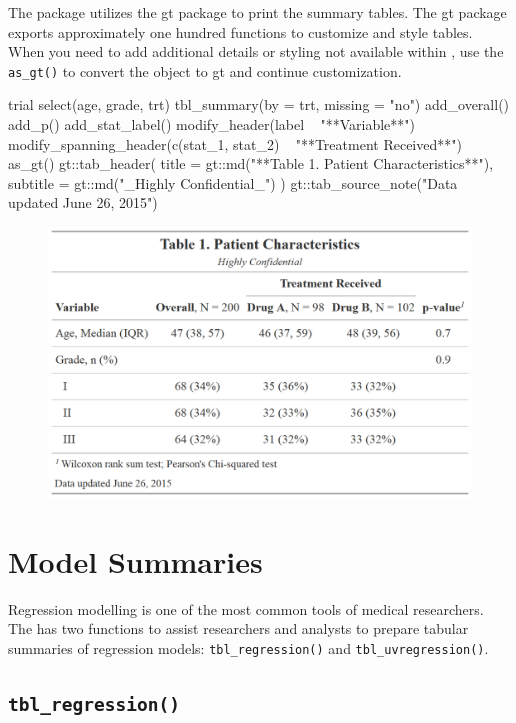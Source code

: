 The  package utilizes the gt package \citep{gt} to print the summary tables.
The gt package exports approximately one hundred functions to customize and style tables.
When you need to add additional details or styling not available within , use the \texttt{as\_gt()} to convert the  object to gt and continue customization.

\begin{example}
trial %
  select(age, grade, trt) %
  tbl_summary(by = trt, missing = "no") %
  add_overall() %
  add_p() %
  add_stat_label() %
  modify_header(label ~ "**Variable**") %
  modify_spanning_header(c(stat_1, stat_2) ~ "**Treatment Received**") %
  as_gt() %
  gt::tab_header(   
    title = gt::md("**Table 1. Patient Characteristics**"),
    subtitle = gt::md("_Highly Confidential_")
  ) %
  gt::tab_source_note("Data updated June 26, 2015")   
\end{example}
\begin{figure}[h!]
  \includegraphics[scale=0.28]{custom.png}
  \centering
\end{figure}

\section{Model Summaries}

Regression modelling is one of the most common tools of medical researchers.
The  has two functions to assist researchers and analysts to prepare tabular summaries of regression models: \texttt{tbl\_regression()} and \texttt{tbl\_uvregression()}.

\subsection{\texorpdfstring{\texttt{tbl\_regression()}}{tbl\_regression()}}

